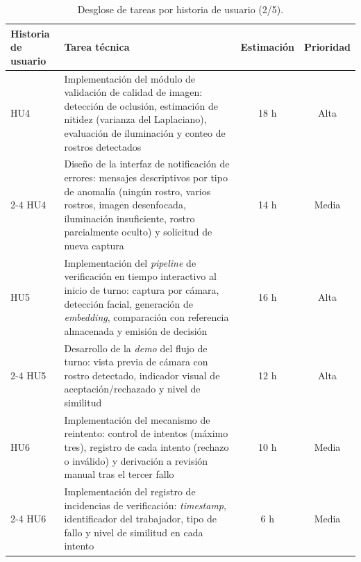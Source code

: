 \documentclass[
  11pt, %
]{charter}
\begin{document}
\begin{table}[htpb]
  \centering
  \caption{Desglose de tareas por historia de usuario (2/5).}
  \begin{tabularx}{\linewidth}{@{}|X|X|c|c|@{}}
    \hline
    \rowcolor[HTML]{C0C0C0}
    Historia de usuario & Tarea técnica & Estimación & Prioridad \\ \hline

    HU4 & Implementación del módulo de validación de calidad de imagen: detección de oclusión, estimación de nitidez (varianza del Laplaciano), evaluación de iluminación y conteo de rostros detectados & 18 h & Alta \\ \cline{2-4}
    HU4 & Diseño de la interfaz de notificación de errores: mensajes descriptivos por tipo de anomalía (ningún rostro, varios rostros, imagen desenfocada, iluminación insuficiente, rostro parcialmente oculto) y solicitud de nueva captura & 14 h & Media \\ \hline

    HU5 & Implementación del \textit{pipeline} de verificación en tiempo interactivo al inicio de turno: captura por cámara, detección facial, generación de \textit{embedding}, comparación con referencia almacenada y emisión de decisión & 16 h & Alta \\ \cline{2-4}
    HU5 & Desarrollo de la \textit{demo} del flujo de turno: vista previa de cámara con rostro detectado, indicador visual de aceptación/rechazado y nivel de similitud & 12 h & Alta \\ \hline

    HU6 & Implementación del mecanismo de reintento: control de intentos (máximo tres), registro de cada intento (rechazo o inválido) y derivación a revisión manual tras el tercer fallo & 10 h & Media \\ \cline{2-4}
    HU6 & Implementación del registro de incidencias de verificación: \textit{timestamp}, identificador del trabajador, tipo de fallo y nivel de similitud en cada intento & 6 h & Media \\ \hline

  \end{tabularx}
\end{table}
\end{document}
